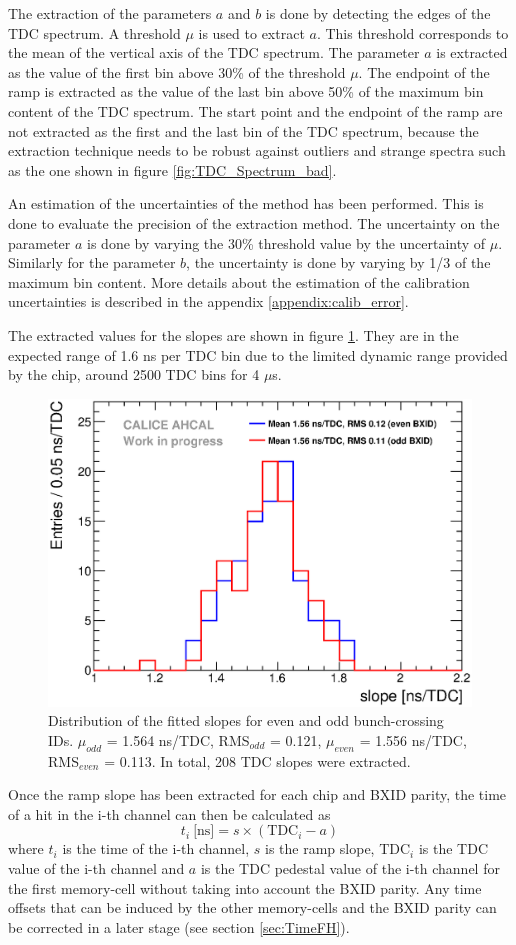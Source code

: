 The extraction of the parameters $a$ and $b$ is done by detecting the edges of the TDC spectrum. A threshold $\mu$ is used to extract $a$. This threshold corresponds to the mean of the vertical axis of the TDC spectrum. The parameter $a$ is extracted as the value of the first bin above 30\% of the threshold $\mu$. The endpoint of the ramp is extracted as the value of the last bin above 50\% of the maximum bin content of the TDC spectrum. The start point and the endpoint of the ramp are not extracted as the first and the last bin of the TDC spectrum, because the extraction technique needs to be robust against outliers and strange spectra such as the one shown in figure \ref{fig:TDC_Spectrum_bad}.

An estimation of the uncertainties of the method has been performed. This is done to evaluate the precision of the extraction method. The uncertainty on the parameter $a$ is done by varying the 30\% threshold value by the uncertainty of $\mu$. Similarly for the parameter $b$, the uncertainty is done by varying by 1/3 of the maximum bin content. More details about the estimation of the calibration uncertainties is described in the appendix \ref{appendix:calib_error}.

The extracted values for the slopes are shown in figure \ref{fig:slope_time}. They are in the expected range of 1.6 ns per TDC bin due to the limited dynamic range provided by the chip, around 2500 TDC bins for 4 $\mu$s.

\begin{figure}[htbp!]
	\centering
	\includegraphics[width=0.5\linewidth]{../Thesis_Plots/Timing/Muons/Plots/SlopesTDC.eps}
	\caption{Distribution of the fitted slopes for even and odd bunch-crossing IDs. $\mu_{odd}$ = 1.564 ns/TDC, RMS$_{odd}$ = 0.121, $\mu_{even}$ = 1.556 ns/TDC, RMS$_{even}$ = 0.113. In total, 208 TDC slopes were extracted.} \label{fig:slope_time}
\end{figure}

Once the ramp slope has been extracted for each chip and BXID parity, the time of a hit in the i-th channel can then be calculated as
\begin{equation} \label{eq:time_chn}
	t_{i} \: \text{[ns]} = s \times (\text{TDC}_{i} - a)
\end{equation}
where $t_{i}$ is the time of the i-th channel, $s$ is the ramp slope, TDC$_{i}$ is the TDC value of the i-th channel and $a$ is the TDC pedestal value of the i-th channel for the first memory-cell without taking into account the BXID parity. Any time offsets that can be induced by the other memory-cells and the BXID parity can be corrected in a later stage (see section \ref{sec:TimeFH}).

